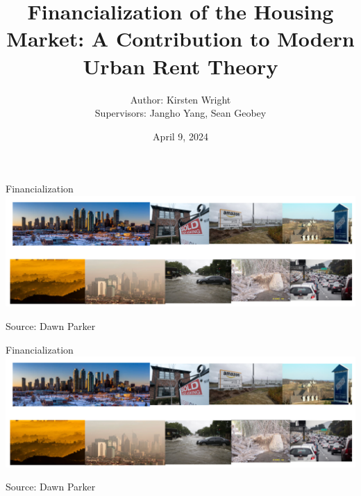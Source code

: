 \documentclass[notes=show]{beamer} %
\title{ Financialization of the Housing Market: A Contribution to Modern Urban Rent Theory}
\author{
  Author: Kirsten Wright \\
  Supervisors: Jangho Yang, Sean Geobey
}
\institute{SYDE Graduate Seminar \\[1ex] University of Waterloo}
\date{April 9, 2024}
\begin{document}

{
    \maketitle   
}



\begin{frame}{Financialization}
    \centering
    \includegraphics[scale=0.167]{fig/example_figures/pictures-ex-1.png}
    \vspace{-2.5em} %
    \begin{flushright}
        \tiny{Source: Dawn Parker}
    \end{flushright}
\end{frame}


\begin{frame}
\begin{figure}[!ht]
\centering
\resizebox{0.85\textwidth}{!}{}
\label{fig-fields}
\end{figure}
\end{frame}


\begin{frame}{Financialization}
    \centering
    \includegraphics[scale=0.167]{fig/example_figures/pictures-ex-1.png}
    \vspace{-2.5em} %
    \begin{flushright}
        \tiny{Source: Dawn Parker}
    \end{flushright}
\end{frame}
\end{document}
